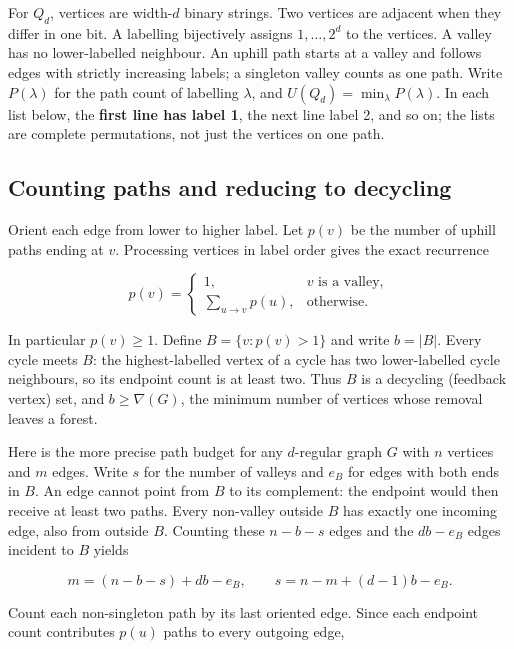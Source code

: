 \documentclass[11pt,a4paper]{article}
\begin{document}
For \(Q_d\), vertices are width-\(d\) binary strings. Two vertices are adjacent when they differ in one bit. A labelling bijectively assigns \(1,\ldots,2^d\) to the vertices. A valley has no lower-labelled neighbour. An uphill path starts at a valley and follows edges with strictly increasing labels; a singleton valley counts as one path. Write \(P(\lambda)\) for the path count of labelling \(\lambda\), and \(U(Q_d)=\min_\lambda P(\lambda)\). In each list below, the \textbf{first line has label 1}, the next line label 2, and so on; the lists are complete permutations, not just the vertices on one path.

\subsection{Counting paths and reducing to decycling}\label{counting-paths-and-reducing-to-decycling}

Orient each edge from lower to higher label. Let \(p(v)\) be the number of uphill paths ending at \(v\). Processing vertices in label order gives the exact recurrence

\[
p(v)=\begin{cases}
1,&v\text{ is a valley},\\
\displaystyle\sum_{u\to v}p(u),&\text{otherwise}.
\end{cases}
\]

In particular \(p(v)\ge1\). Define \(B=\{v:p(v)>1\}\) and write \(b=|B|\). Every cycle meets \(B\): the highest-labelled vertex of a cycle has two lower-labelled cycle neighbours, so its endpoint count is at least two. Thus \(B\) is a decycling (feedback vertex) set, and \(b\ge\nabla(G)\), the minimum number of vertices whose removal leaves a forest.

Here is the more precise path budget for any \(d\)-regular graph \(G\) with \(n\) vertices and \(m\) edges. Write \(s\) for the number of valleys and \(e_B\) for edges with both ends in \(B\). An edge cannot point from \(B\) to its complement: the endpoint would then receive at least two paths. Every non-valley outside \(B\) has exactly one incoming edge, also from outside \(B\). Counting these \(n-b-s\) edges and the \(db-e_B\) edges incident to \(B\) yields

\[
m=(n-b-s)+db-e_B,\qquad
s=n-m+(d-1)b-e_B.
\]

Count each non-singleton path by its last oriented edge. Since each endpoint count contributes \(p(u)\) paths to every outgoing edge,
\end{document}
